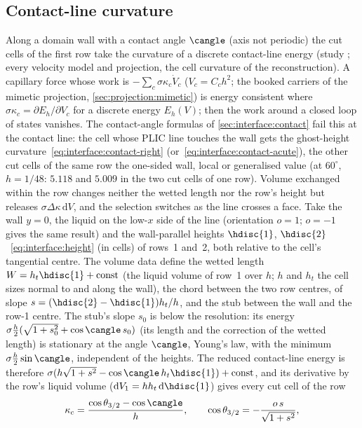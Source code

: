 \subsection{Contact-line curvature}\label{sec:forces:contact-line}
Along a domain wall with a contact angle $\cangle$ (axis not periodic) the cut
cells of the first row take the curvature of a discrete contact-line energy
(study ; every velocity model and projection, the
cell curvature of the reconstruction). A capillary force whose work is
$-\sum_c\sigma\kappa_c\dot V_c$ ($V_c=C_ch^2$; the booked carriers of the
mimetic projection, \cref{sec:projection:mimetic}) is energy consistent where
$\sigma\kappa_c=\partial E_h/\partial V_c$ for a discrete energy $E_h(V)$;
then the work around a closed loop of states vanishes. The contact-angle
formulas of \cref{sec:interface:contact} fail this at the contact line: the
cell whose PLIC line touches the wall gets the ghost-height
curvature~\cref{eq:interface:contact-right}
(or~\cref{eq:interface:contact-acute}), the other cut cells of the same row
the one-sided wall, local or generalised value (at $60^\circ$, $h=1/48$:
$5.118$ and $5.009$ in the two cut cells of one row). Volume exchanged within
the row changes neither the wetted length nor the row's height but releases
$\sigma\Delta\kappa\,\mathrm dV$, and the selection switches as the line
crosses a face. Take the wall $y=0$, the liquid on the low-$x$ side of the
line (orientation $o=1$; $o=-1$ gives the same result) and the wall-parallel
heights $\hdisc{1}$, $\hdisc{2}$~\cref{eq:interface:height} (in cells) of rows~1
and~2, both relative to the cell's tangential centre. The volume data define
the wetted length $W=h_t\hdisc{1}+\text{const}$ (the liquid volume of row~1
over $h$; $h$ and $h_t$ the cell sizes normal to and along the wall), the
chord between the two row centres, of slope
$s=(\hdisc{2}-\hdisc{1})h_t/h$, and the stub between the wall and the row-1 centre.
The stub's slope $s_0$ is below the resolution: its energy
$\sigma\frac h2(\sqrt{1+s_0^2}+\cos\cangle\,s_0)$ (its length and the
correction of the wetted length) is stationary at the angle $\cangle$, Young's
law, with the minimum $\sigma\frac h2\sin\cangle$, independent of the heights.
The reduced contact-line energy is therefore
$\sigma(h\sqrt{1+s^2}-\cos\cangle\,h_t\hdisc{1})+\text{const}$, and its
derivative by the row's liquid volume ($\mathrm dV_1=hh_t\,\mathrm d\hdisc{1}$)
gives every cut cell of the row
\begin{equation}\label{eq:forces:contact-line}
  \kappa_c=\frac{\cos\theta_{3/2}-\cos\cangle}{h},\qquad
  \cos\theta_{3/2}=-\frac{o\,s}{\sqrt{1+s^2}},
\end{equation}
